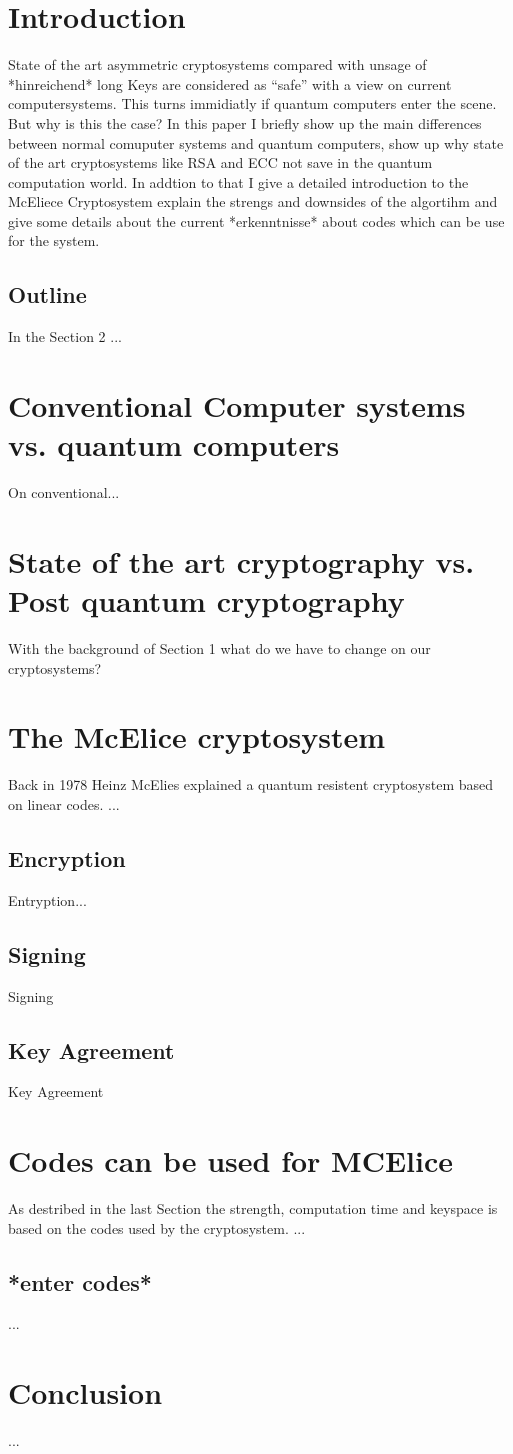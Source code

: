 \section{Introduction}
State of the art asymmetric cryptosystems compared with unsage of *hinreichend* long Keys are considered as "`safe"' with a view on current computersystems. This turns immidiatly if quantum computers enter the scene. But why is this the case? In this paper I briefly show up the main differences between normal comuputer systems and quantum computers, show up why state of the art cryptosystems like RSA and ECC not save in the quantum computation world. In addtion to that I give a detailed introduction to the McEliece Cryptosystem explain the strengs and downsides of the algortihm and give some details about the current *erkenntnisse* about codes which can be use for the system.
\subsection*{Outline}
In the Section 2 ...
\section{Conventional Computer systems vs. quantum computers}
On conventional...
\section{State of the art cryptography vs. Post quantum cryptography}
With the background of Section 1 what do we have to change on our cryptosystems?
\section{The McElice cryptosystem}
Back in 1978 Heinz McElies explained a quantum resistent cryptosystem based on linear codes. ... 
\subsection{Encryption}
Entryption...
\subsection{Signing}
Signing
\subsection{Key Agreement}
Key Agreement
\section{Codes can be used for MCElice}
As destribed in the last Section the strength, computation time and keyspace is based on the codes used by the cryptosystem. ...
\subsection{*enter codes*}
...
\section{Conclusion}
...
